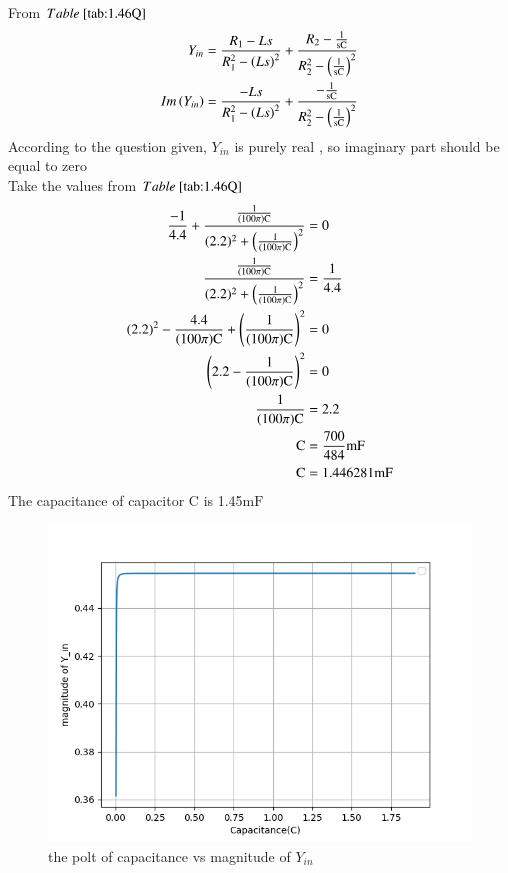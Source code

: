 \documentclass[a4,12pt,onecolumn]{IEEEtran}
\begin{document}
From $\tabref{tab:1.46Q}$
\begin{align} 
Y_{in}&=\frac{R_1-Ls}{R_1^2-\left(Ls\right)^2} + \frac{R_2-\frac{1}{ \text{sC}}}{R_2^2-\left(\frac{1}{ \text{sC}}\right)^2}\\
Im\left(Y_{in}\right)&=\frac{-Ls}{R_1^2-\left(Ls\right)^2} + \frac{-\frac{1}{ \text{sC}}}{R_2^2-\left(\frac{1}{ \text{sC}}\right)^2}
\end{align}
According to the question given, $Y_{in}$ is purely real , so imaginary part should be equal to zero\\
Take the values from $\tabref{tab:1.46Q}$\\
\begin{align}
 \frac{-1}{4.4}+\frac{\frac{1}{ (100\pi) \text{C}}}{(2.2)^2+\left(\frac{1}{ (100\pi) \text{C}}\right)^2}&=0\\ 
 \frac{\frac{1}{ (100\pi) \text{C}}}{(2.2)^2+\left(\frac{1}{ (100\pi) \text{C}}\right)^2}&=\frac{1}{4.4}\\
  (2.2)^2-\frac{4.4}{ (100\pi) \text{C}}+\left(\frac{1}{ (100\pi) \text{C}}\right)^2&=0\\
 \left(2.2-\frac{1}{ (100\pi) \text{C}}\right)^2&=0\\
 \frac{1}{ (100\pi) \text{C}}&=2.2\\
 \text{C}&=\frac{700}{484}\text{mF}\\
 \text{C}&=1.446281\text{mF}
\end{align}
The capacitance of capacitor $\text{C}$ is 1.45$\text{mF}$
\begin{figure}[ht!]
\includegraphics[width=\columnwidth]{figs/fig2.png}
\caption{\large{the polt of capacitance vs magnitude of $Y_{in}$}}
\end{figure}
\end{document}

